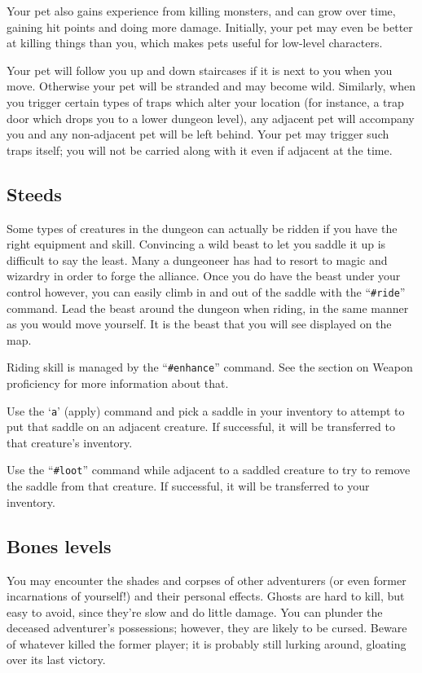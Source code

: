 \documentclass[titlepage]{article}
\begin{document}
Your pet also gains experience from killing monsters, and can grow
over time, gaining hit points and doing more damage.  Initially, your
pet may even be better at killing things than you, which makes pets
useful for low-level characters.

Your pet will follow you up and down staircases if it is next to you
when you move.  Otherwise your pet will be stranded and may become
wild.  Similarly, when you trigger certain types of traps which alter
your location (for instance, a trap door which drops you to a lower
dungeon level), any adjacent pet will accompany you and any non-adjacent
pet will be left behind.  Your pet may trigger such traps itself; you
will not be carried along with it even if adjacent at the time.

\subsection*{Steeds}

Some types of creatures in the dungeon can actually be ridden if you
have the right equipment and skill.  Convincing a wild beast to let
you saddle it up is difficult to say the least.  Many a dungeoneer
has had to resort to magic and wizardry in order to forge the alliance.
Once you do have the beast under your control however, you can
easily climb in and out of the saddle with the ``\texttt{\#ride}'' command.  Lead
the beast around the dungeon when riding, in the same manner as
you would move yourself.  It is the beast that you will see displayed
on the map.

Riding skill is managed by the ``\texttt{\#enhance}'' command.  See the section
on Weapon proficiency for more information about that.

Use the `\texttt{a}' (apply) command and pick a saddle in your inventory to
attempt to put that saddle on an adjacent creature.  If successful,
it will be transferred to that creature's inventory.

Use the ``\texttt{\#loot}'' command while adjacent to a saddled creature to
try to remove the saddle from that creature.  If successful, it will
be transferred to your inventory.

\subsection*{Bones levels}

You may encounter the shades and corpses of other adventurers (or even
former incarnations of yourself!) and their personal effects.  Ghosts
are hard to kill, but easy to avoid, since they're slow and do little
damage.  You can plunder the deceased adventurer's possessions;
however, they are likely to be cursed.  Beware of whatever killed the
former player; it is probably still lurking around, gloating over its
last victory.
\end{document}
